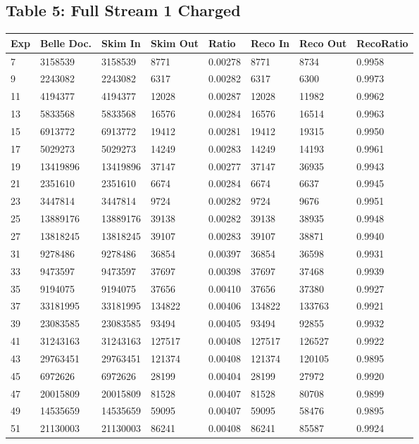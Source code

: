 \documentclass[11pt]{article}
\begin{document}
\subsection{Table 5: Full Stream 1 Charged}
\begin{tabular}{ | l || l | l | l | l || l | l | l |}
  \hline
  Exp&Belle Doc.& Skim In& Skim Out&Ratio&Reco In&Reco Out&RecoRatio\\\hline
  \hline
  7&3158539&3158539&8771&0.00278&8771&8734&0.9958\\\hline
  9&2243082&2243082&6317&0.00282&6317&6300&0.9973\\\hline
  11&4194377&4194377&12028&0.00287&12028&11982&0.9962\\\hline
  13&5833568&5833568&16576&0.00284&16576&16514&0.9963\\\hline
  15&6913772&6913772&19412&0.00281&19412&19315&0.9950\\\hline
  17&5029273&5029273&14249&0.00283&14249&14193&0.9961\\\hline
  19&13419896&13419896&37147&0.00277&37147&36935&0.9943\\\hline
  21&2351610&2351610&6674&0.00284&6674&6637&0.9945\\\hline
  23&3447814&3447814&9724&0.00282&9724&9676&0.9951\\\hline
  25&13889176&13889176&39138&0.00282&39138&38935&0.9948\\\hline
  27&13818245&13818245&39107&0.00283&39107&38871&0.9940\\\hline
  \hline
  31&9278486&9278486&36854&0.00397&36854&36598&0.9931\\\hline
  33&9473597&9473597&37697&0.00398&37697&37468&0.9939\\\hline
  35&9194075&9194075&37656&0.00410&37656&37380&0.9927\\\hline
  37&33181995&33181995&134822&0.00406&134822&133763&0.9921\\\hline
  39&23083585&23083585&93494&0.00405&93494&92855&0.9932\\\hline
  41&31243163&31243163&127517&0.00408&127517&126527&0.9922\\\hline
  43&29763451&29763451&121374&0.00408&121374&120105&0.9895\\\hline
  45&6972626&6972626&28199&0.00404&28199&27972&0.9920\\\hline
  47&20015809&20015809&81528&0.00407&81528&80708&0.9899\\\hline
  49&14535659&14535659&59095&0.00407&59095&58476&0.9895\\\hline
  51&21130003&21130003&86241&0.00408&86241&85587&0.9924\\\hline

\end{tabular}
\end{document}
